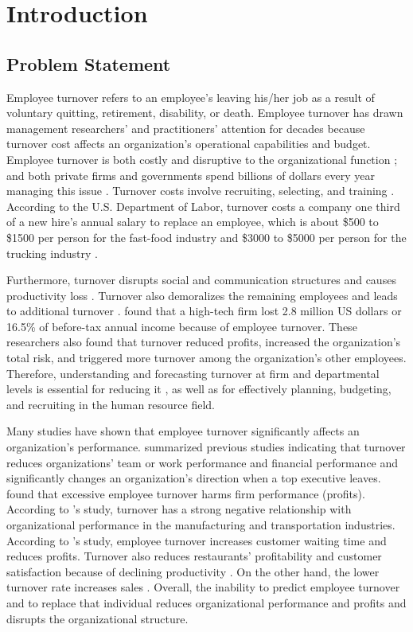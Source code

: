 \chapter{Introduction} \label{ch:introduction}
\section{Problem Statement}
Employee turnover refers to an employee's leaving his/her job as a result of voluntary quitting, retirement, disability, or death. Employee turnover has drawn management researchers' and practitioners' attention for decades because turnover cost affects an organization's operational capabilities and budget. Employee turnover is both costly and disruptive to the organizational function \citep{kacmar2006, mueller1989,staw1980}; and both private firms and governments spend billions of dollars every year managing this issue \citeyearpar{leonard2001}. %
Turnover costs involve recruiting, selecting, and training \citep{mobley1982, staw1980}. According to the U.S. Department of Labor, turnover costs a company one third of a new hire's annual salary to replace an employee, which is about \$500 to \$1500 per person for the fast-food industry and \$3000 to \$5000 per person for the trucking industry \citep{white1995}. 

Furthermore, turnover disrupts social and communication structures and causes productivity loss \citep{mobley1982}. Turnover also demoralizes the remaining employees and leads to additional turnover \citep{staw1980}. \citet{sagie2002} found that a high-tech firm lost 2.8 million US dollars or 16.5\% of before-tax annual income because of employee turnover. These researchers also found that turnover reduced profits, increased the organization's total risk, and triggered more turnover among the organization's other employees. Therefore, understanding and forecasting turnover at firm and departmental levels is essential for reducing it \citep{kacmar2006}, as well as for effectively planning, budgeting, and recruiting in the human resource field. 

Many studies have shown that employee turnover significantly affects an organization's performance. \citet{staw1980} summarized previous studies indicating that turnover reduces organizations' team or work performance and financial performance and significantly changes an organization's direction when a top executive leaves. \citet{glebbeek2004} found that excessive employee turnover harms firm performance (profits). According to \citet{hancock2013}'s study, turnover has a strong negative relationship with organizational performance in the manufacturing and transportation industries. According to \citet{kacmar2006}'s study, employee turnover increases customer waiting time and reduces profits. Turnover also reduces restaurants' profitability and customer satisfaction because of declining productivity \citep{detert2007}. On the other hand, the lower turnover rate increases sales \citep{batt2002}. Overall, the inability to predict employee turnover and to replace that individual reduces organizational performance and profits and disrupts the organizational structure.

